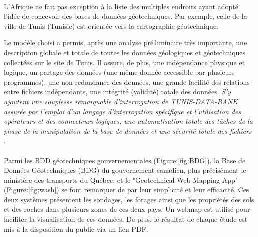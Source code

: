 
\paragraph{}
L'Afrique ne fait pas exception à la liste des multiples endroits ayant adopté l'idée
de concevoir des bases de données géotechniques.
Par exemple, celle de la ville de Tunis (Tunisie) est orientée vers la cartographie géotechnique.
\par
Le modèle choisi a permis, après une analyse
pré1iminaire très importante, une description globale et
totale de toutes les données géologiques et géotechniques collectées sur le site de Tunis. Il
assure, de plus, une indépendance physique et logique, un partage des données (une même donnée accessible  
par plusieurs programmes), une non-redondance des données, une grande facilité des relations
entre fichiers indépendants, une intégrité (validité)
totale des données. 
\textit{S'y ajoutent une souplesse remarquable d'interrogation de TUNIS-DATA-BANK
assurée par l'emploi d'un langage d'interrogation spécifique et l'utilisation des opérateurs et des connecteurs
logiques, une automatisation totale des tâches de la
phase de la manipulation de la base de données et une
sécurité totale des fichiers}
\cite{mongereau1988conception}.

\paragraph{} 
Parmi les BDD géotechniques gouvernementales (Figure:\ref{fig:BDG}), la Base de Données Géotechniques
(BDG) du gouvernement canadien, plus précisément le
ministère des transports du Québec, et le "Geotechnical Web Mapping App" (Figure:\ref{fig:wash}) se font remarquer
de par leur simplicité et leur efficacité. Ces deux systèmes présentent les sondages, les forages ainsi que les 
propriétés des sols et des roches dans plusieurs zones de ces deux pays.
Un webmap est utilisé pour faciliter la visualisation de ces données.
De plus, le résultat de chaque étude est mis à la disposition du public
via un lien PDF.

